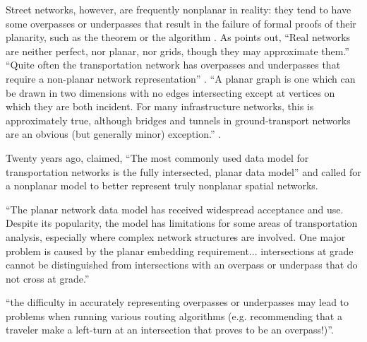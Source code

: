 \documentclass[Afour,sageh,times]{sagej}
\begin{document}
Street networks, however, are frequently nonplanar in reality: they tend to have some overpasses or underpasses that result in the failure of formal proofs of their planarity, such as the \citet{kuratowski_sur_1930} theorem or the \cite{hopcroft_efficient_1974} algorithm \citep{gastner_spatial_2006}. As \citet[p.~7]{levinson_network_2012} points out, \enquote{Real networks are neither perfect, nor planar, nor grids, though they may approximate them.} \enquote{Quite often the transportation network has overpasses and underpasses that require a non-planar network representation} \citet[p.~199]{jiang_object-oriented_2010}. \enquote{A planar graph is one which can be drawn in two dimensions with no edges intersecting except at vertices on which they are both incident. For many infrastructure networks, this is approximately true, although bridges and tunnels in ground-transport networks are an obvious (but generally minor) exception.} \citet[p.~1258]{fischer_spatial_2014}.

Twenty years ago, \citep[p.~18]{fohl_non-planar_1996} claimed, \enquote{The most commonly used data model for transportation networks is the fully intersected, planar data model} and called for a nonplanar model to better represent truly nonplanar spatial networks.

\enquote{The planar network data model has received widespread acceptance and use. Despite its popularity, the
model has limitations for some areas of transportation analysis, especially where complex network structures
are involved. One major problem is caused by the planar embedding requirement... intersections at grade cannot be distinguished from intersections with an overpass or underpass that do not cross at grade.} \citep[p.~395]{fischer_gis_2004}

\citet[p.~6]{kwan_review_1996} \enquote{the difficulty in accurately representing overpasses or underpasses may lead to problems when running various routing algorithms (e.g. recommending that a traveler make a left-turn at an intersection that proves to be an overpass!)}.
\end{document}
